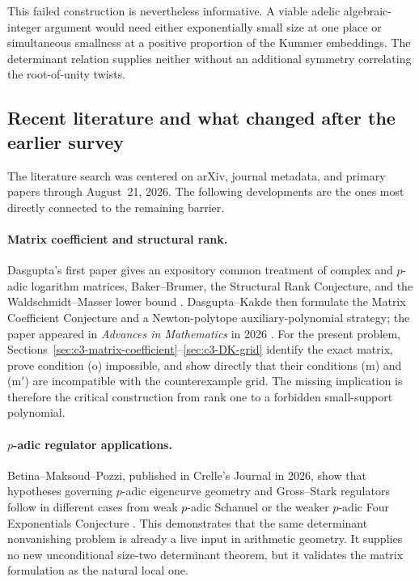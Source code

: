 \documentclass[11pt,oneside]{article}
\theoremstyle{definition}
\theoremstyle{remark}
\begin{document}
This failed construction is nevertheless informative.  A viable adelic algebraic-integer
argument would need either exponentially small size at one place or simultaneous smallness at
a positive proportion of the Kummer embeddings.  The determinant relation supplies neither
without an additional symmetry correlating the root-of-unity twists.

\subsection{Recent literature and what changed after the earlier survey}
\label{sec:c3-literature}

The literature search was centered on arXiv, journal metadata, and primary papers through
August~21, 2026.  The following developments are the ones most directly connected to the
remaining barrier.

\paragraph{Matrix coefficient and structural rank.}
Dasgupta's first paper gives an expository common treatment of complex and $p$-adic logarithm
matrices, Baker--Brumer, the Structural Rank Conjecture, and the Waldschmidt--Masser lower
bound \cite{Dasgupta2023}.  Dasgupta--Kakde then formulate the Matrix Coefficient Conjecture
and a Newton-polytope auxiliary-polynomial strategy; the paper appeared in
\emph{Advances in Mathematics} in 2026 \cite{DasguptaKakde2026}.  For the present problem,
Sections~\ref{sec:c3-matrix-coefficient}--\ref{sec:c3-DK-grid} identify the exact matrix,
prove condition (o) impossible, and show directly that their conditions (m) and (m$'$) are
incompatible with the counterexample grid.  The missing implication is therefore the critical
construction from rank one to a forbidden small-support polynomial.

\paragraph{$p$-adic regulator applications.}
Betina--Maksoud--Pozzi, published in Crelle's Journal in 2026, show that hypotheses governing
$p$-adic eigencurve geometry and Gross--Stark regulators follow in different cases from weak
$p$-adic Schanuel or the weaker $p$-adic Four Exponentials Conjecture
\cite{BetinaMaksoudPozzi2026}.  This demonstrates that the same determinant nonvanishing
problem is already a live input in arithmetic geometry.  It supplies no new unconditional
size-two determinant theorem, but it validates the matrix formulation as the natural local
one.
\end{document}
